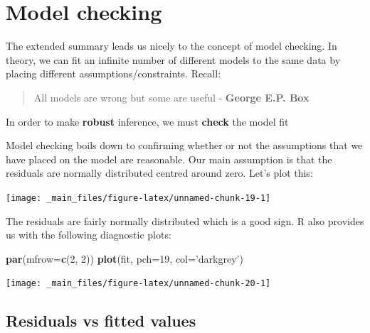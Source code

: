 \documentclass[]{book}
\newenvironment{Shaded}{\begin{snugshade}}{\end{snugshade}}
\newcommand{\KeywordTok}[1]{\textcolor[rgb]{0.13,0.29,0.53}{\textbf{#1}}}
\newcommand{\DataTypeTok}[1]{\textcolor[rgb]{0.13,0.29,0.53}{#1}}
\newcommand{\DecValTok}[1]{\textcolor[rgb]{0.00,0.00,0.81}{#1}}
\newcommand{\StringTok}[1]{\textcolor[rgb]{0.31,0.60,0.02}{#1}}
\newcommand{\OperatorTok}[1]{\textcolor[rgb]{0.81,0.36,0.00}{\textbf{#1}}}
\newcommand{\NormalTok}[1]{#1}
\theoremstyle{definition}
\theoremstyle{definition}
\theoremstyle{definition}
\theoremstyle{remark}
\begin{document}
\section{Model checking}\label{model-checking}

The extended summary leads us nicely to the concept of model checking.
In theory, we can fit an infinite number of different models to the same
data by placing different assumptions/constraints. Recall:

\begin{quote}
All models are wrong but some are useful - \textbf{George E.P. Box}
\end{quote}

In order to make \textbf{robust} inference, we must \textbf{check} the
model fit

Model checking boils down to confirming whether or not the assumptions
that we have placed on the model are reasonable. Our main assumption is
that the residuals are normally distributed centred around zero. Let's
plot this:

\begin{Shaded}
\end{Shaded}

\begin{center}\texttt{[image: \_main\_files/figure-latex/unnamed-chunk-19-1]} \end{center}

The residuals are fairly normally distributed which is a good sign. R
also provides us with the following diagnostic plots:

\begin{Shaded}
\begin{Highlighting}[]
\KeywordTok{par}\NormalTok{(}\DataTypeTok{mfrow=}\KeywordTok{c}\NormalTok{(}\DecValTok{2}\NormalTok{, }\DecValTok{2}\NormalTok{))}
\KeywordTok{plot}\NormalTok{(fit, }\DataTypeTok{pch=}\DecValTok{19}\NormalTok{, }\DataTypeTok{col=}\StringTok{'darkgrey'}\NormalTok{)}
\end{Highlighting}
\end{Shaded}

\begin{center}\texttt{[image: \_main\_files/figure-latex/unnamed-chunk-20-1]} \end{center}

\subsection{Residuals vs fitted
values}\label{residuals-vs-fitted-values}
\end{document}
